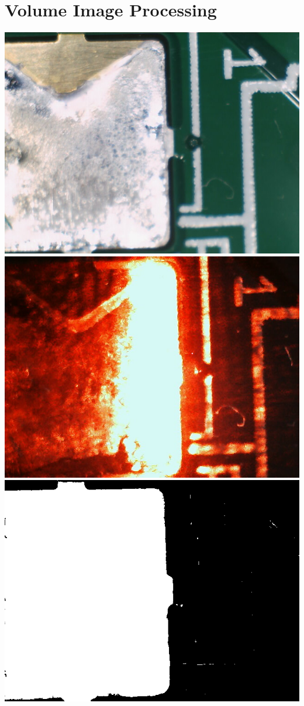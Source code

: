\documentclass[12pt]{article}
\begin{document}
\section{Volume Image Processing}
\includegraphics{images/volume_image_processing/led_image.png}
\includegraphics{images/volume_image_processing/laser_image.png}
\includegraphics{images/volume_image_processing/binary_led_image.png}
\end{document}
